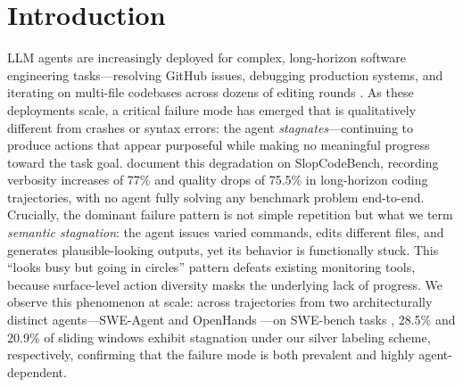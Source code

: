 \section{Introduction}
\label{sec:introduction}

LLM agents are increasingly deployed for complex, long-horizon software engineering tasks---resolving GitHub issues, debugging production systems, and iterating on multi-file codebases across dozens of editing rounds \citep{jimenez2024swebench,yang2024sweagent,wang2025openhands}.
As these deployments scale, a critical failure mode has emerged that is qualitatively different from crashes or syntax errors: the agent \emph{stagnates}---continuing to produce actions that appear purposeful while making no meaningful progress toward the task goal.
\citet{orlanski2026slopcodebench} document this degradation on SlopCodeBench, recording verbosity increases of 77\% and quality drops of 75.5\% in long-horizon coding trajectories, with no agent fully solving any benchmark problem end-to-end.
Crucially, the dominant failure pattern is not simple repetition but what we term \emph{semantic stagnation}: the agent issues varied commands, edits different files, and generates plausible-looking outputs, yet its behavior is functionally stuck.
This ``looks busy but going in circles'' pattern defeats existing monitoring tools, because surface-level action diversity masks the underlying lack of progress.
We observe this phenomenon at scale: across trajectories from two architecturally distinct agents---SWE-Agent \citep{yang2024sweagent} and OpenHands \citep{wang2025openhands}---on SWE-bench tasks \citep{jimenez2024swebench}, 28.5\% and 20.9\% of sliding windows exhibit stagnation under our silver labeling scheme, respectively, confirming that the failure mode is both prevalent and highly agent-dependent.

